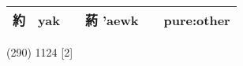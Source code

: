 \documentclass[14pt,a4paper]{scrartcl}
\begin{document}
\begin{longtable}[c]{@{}llllll@{}}
\begin{minipage}[t]{0.14\columnwidth}\raggedright\strut
約
\strut\end{minipage} &
\begin{minipage}[t]{0.14\columnwidth}\raggedright\strut
yak
\strut\end{minipage} &
\begin{minipage}[t]{0.14\columnwidth}\raggedright\strut
\strut\end{minipage} &
\begin{minipage}[t]{0.14\columnwidth}\raggedright\strut
葯 'aewk
\strut\end{minipage} &
\begin{minipage}[t]{0.14\columnwidth}\raggedright\strut
\strut\end{minipage} &
\begin{minipage}[t]{0.14\columnwidth}\raggedright\strut
pure:other
\strut\end{minipage}\tabularnewline
\bottomrule
\end{longtable}

(290) 1124 {[}2{]}
\end{document}
